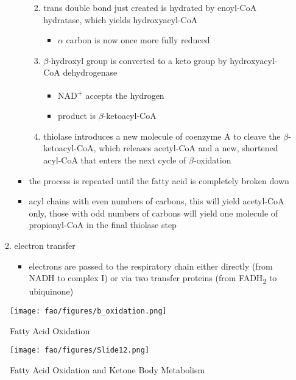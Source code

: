 \documentclass[12pt]{scrartcl}
\begin{document}
\begin{itemize}
\begin{enumerate}
\begin{itemize}
\begin{enumerate}
\begin{itemize}
\end{itemize}
\item trans double bond just created is hydrated by enoyl-CoA
hydratase, which yields hydroxyacyl-CoA
\begin{itemize}
\item \(\alpha\) carbon is now once more fully reduced
\end{itemize}
\item \(\beta\)-hydroxyl group is converted to a keto group by
hydroxyacyl-CoA dehydrogenase
\begin{itemize}
\item NAD\textsuperscript{+} accepts the hydrogen
\item product is \(\beta\)-ketoacyl-CoA
\end{itemize}
\item thiolase introduces a new molecule of coenzyme A to cleave
the \(\beta\)-ketoacyl-CoA, which releases acetyl-CoA and a new,
shortened acyl-CoA that enters the next cycle of
\(\beta\)-oxidation
\end{enumerate}
\item the process is repeated until the fatty acid is completely
broken down
\item acyl chains with even numbers of carbons, this will yield
acetyl-CoA only, those with odd numbers of carbons will yield
one molecule of propionyl-CoA in the final thiolase step
\end{itemize}
\item electron transfer
\begin{itemize}
\item electrons are passed to the respiratory chain either directly
(from NADH to complex I) or via two transfer proteins (from
FADH\textsubscript{2} to ubiquinone)
\end{itemize}
\end{enumerate}
\end{itemize}

\begin{figure}[htbp]
\centering
\texttt{[image: fao/figures/b\_oxidation.png]}
\caption{\label{fig:orga539211}Fatty Acid Oxidation}
\end{figure}

\begin{figure}[htbp]
\centering
\texttt{[image: fao/figures/Slide12.png]}
\caption{\label{fig:orgc0f13b0}Fatty Acid Oxidation and Ketone Body Metabolism}
\end{figure}
\end{document}
